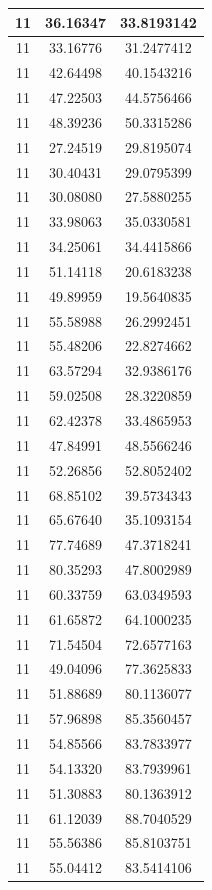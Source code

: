 \documentclass[
]{book}
\begin{document}
\begin{tabular}{c|c|c}
\hline
11 & 36.16347 & 33.8193142\\
\hline
11 & 33.16776 & 31.2477412\\
\hline
11 & 42.64498 & 40.1543216\\
\hline
11 & 47.22503 & 44.5756466\\
\hline
11 & 48.39236 & 50.3315286\\
\hline
11 & 27.24519 & 29.8195074\\
\hline
11 & 30.40431 & 29.0795399\\
\hline
11 & 30.08080 & 27.5880255\\
\hline
11 & 33.98063 & 35.0330581\\
\hline
11 & 34.25061 & 34.4415866\\
\hline
11 & 51.14118 & 20.6183238\\
\hline
11 & 49.89959 & 19.5640835\\
\hline
11 & 55.58988 & 26.2992451\\
\hline
11 & 55.48206 & 22.8274662\\
\hline
11 & 63.57294 & 32.9386176\\
\hline
11 & 59.02508 & 28.3220859\\
\hline
11 & 62.42378 & 33.4865953\\
\hline
11 & 47.84991 & 48.5566246\\
\hline
11 & 52.26856 & 52.8052402\\
\hline
11 & 68.85102 & 39.5734343\\
\hline
11 & 65.67640 & 35.1093154\\
\hline
11 & 77.74689 & 47.3718241\\
\hline
11 & 80.35293 & 47.8002989\\
\hline
11 & 60.33759 & 63.0349593\\
\hline
11 & 61.65872 & 64.1000235\\
\hline
11 & 71.54504 & 72.6577163\\
\hline
11 & 49.04096 & 77.3625833\\
\hline
11 & 51.88689 & 80.1136077\\
\hline
11 & 57.96898 & 85.3560457\\
\hline
11 & 54.85566 & 83.7833977\\
\hline
11 & 54.13320 & 83.7939961\\
\hline
11 & 51.30883 & 80.1363912\\
\hline
11 & 61.12039 & 88.7040529\\
\hline
11 & 55.56386 & 85.8103751\\
\hline
11 & 55.04412 & 83.5414106\\

\end{tabular}
\end{document}
